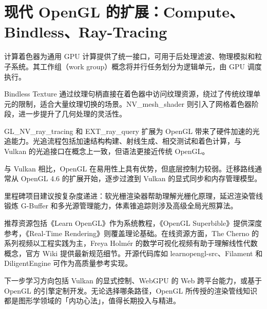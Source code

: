 \chapter{现代 OpenGL 的扩展：Compute、Bindless、Ray-Tracing}
计算着色器为通用 GPU 计算提供了统一接口，可用于后处理滤波、物理模拟和粒子系统。其工作组（work group）概念将并行任务划分为逻辑单元，由 GPU 调度执行。\par
Bindless Texture 通过纹理句柄直接在着色器中访问纹理资源，绕过了传统纹理单元的限制，适合大量纹理切换的场景。NV\_{}mesh\_{}shader 则引入了网格着色器阶段，进一步提升了几何处理的灵活性。\par
GL\_{}NV\_{}ray\_{}tracing 和 EXT\_{}ray\_{}query 扩展为 OpenGL 带来了硬件加速的光追能力。光追流程包括加速结构构建、射线生成、相交测试和着色计算，与 Vulkan 的光追接口在概念上一致，但语法更接近传统 OpenGL。\par
与 Vulkan 相比，OpenGL 在易用性上具有优势，但底层控制力较弱。迁移路线通常从 OpenGL 4.6 的扩展开始，逐步过渡到 Vulkan 的显式同步和内存管理模型。\par
里程碑项目建议按复杂度递进：软光栅渲染器帮助理解光栅化原理，延迟渲染管线锻炼 G-Buffer 和多光源管理能力，体素锥追踪则涉及高级全局光照算法。\par
推荐资源包括《Learn OpenGL》作为系统教程，《OpenGL Superbible》提供深度参考，《Real-Time Rendering》则覆盖理论基础。在线资源方面，The Cherno 的系列视频以工程实践为主，Freya Holmér 的数学可视化视频有助于理解线性代数概念，官方 Wiki 提供最新规范细节。开源代码库如 learnopengl-src、Filament 和 DiligentEngine 可作为高质量参考实现。\par
下一步学习方向包括 Vulkan 的显式控制、WebGPU 的 Web 跨平台能力，或基于 OpenGL 的引擎定制开发。无论选择哪条路径，OpenGL 所传授的渲染管线知识都是图形学领域的「内功心法」，值得长期投入与精进。\par
